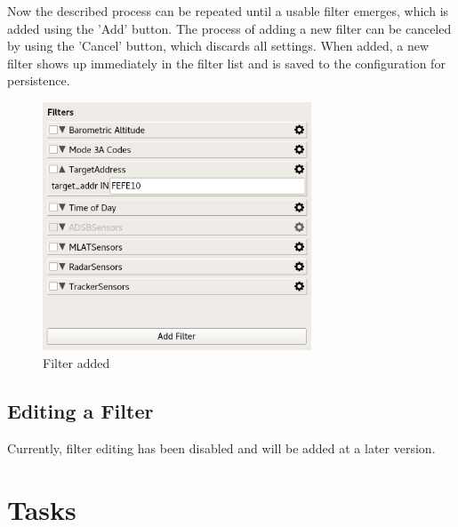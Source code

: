 \documentclass[10pt,letterpaper,extrafontsizes]{memoir}
\begin{document}
Now the described process can be repeated until a usable filter emerges, which is added using the 'Add'
button. The process of adding a new filter can be canceled by using the 'Cancel' button, which discards all
settings. When added, a new filter shows up immediately in the filter list and is saved to the configuration
for persistence.

\begin{figure}[H]
  \center
    \includegraphics[width=8cm]{../screenshots/filter_add3.png}
  \caption{Filter added}
  \label{fig:filter_add3}
\end{figure}

\subsection{Editing a Filter}
\label{sec:filter_editing}

Currently, filter editing has been disabled and will be added at a later version.




\section{Tasks}
\label{sec:tasks}
\end{document}
